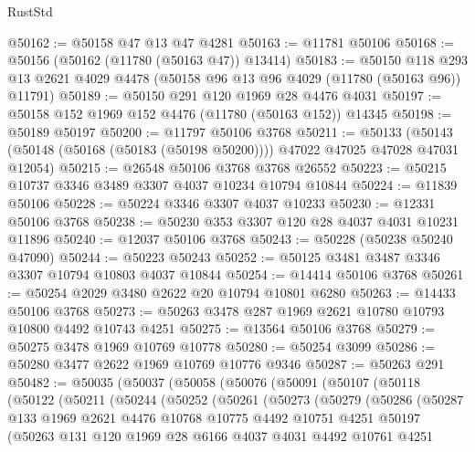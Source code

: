 \begin{lexlean}{RustStd}
\begin{coremodule}
@50162 := @50158 @47 @13 @47 @4281
@50163 := @11781 @50106
@50168 := @50156 (@50162 (@11780 (@50163 @47)) @13414)
@50183 := @50150
    @118
    @293
    @13
    @2621
    @4029
    @4478
    (@50158 @96 @13 @96 @4029 (@11780 (@50163 @96)) @11791)
@50189 := @50150 @291 @120 @1969 @28 @4476 @4031
@50197 := @50158 @152 @1969 @152 @4476 (@11780 (@50163 @152)) @14345
@50198 := @50189 @50197
@50200 := @11797 @50106 @3768
@50211 := @50133
    (@50143 (@50148 (@50168 (@50183 (@50198 @50200)))) @47022 @47025 @47028 @47031 @12054)
@50215 := @26548 @50106 @3768 @3768 @26552
@50223 := @50215 @10737 @3346 @3489 @3307 @4037 @10234 @10794 @10844
@50224 := @11839 @50106
@50228 := @50224 @3346 @3307 @4037 @10233
@50230 := @12331 @50106 @3768
@50238 := @50230 @353 @3307 @120 @28 @4037 @4031 @10231 @11896
@50240 := @12037 @50106 @3768
@50243 := @50228 (@50238 @50240 @47090)
@50244 := @50223 @50243
@50252 := @50125 @3481 @3487 @3346 @3307 @10794 @10803 @4037 @10844
@50254 := @14414 @50106 @3768
@50261 := @50254 @2029 @3480 @2622 @20 @10794 @10801 @6280
@50263 := @14433 @50106 @3768
@50273 := @50263 @3478 @287 @1969 @2621 @10780 @10793 @10800 @4492 @10743 @4251
@50275 := @13564 @50106 @3768
@50279 := @50275 @3478 @1969 @10769 @10778
@50280 := @50254 @3099
@50286 := @50280 @3477 @2622 @1969 @10769 @10776 @9346
@50287 := @50263 @291
@50482 := @50035
    (@50037
      (@50058
        (@50076
          (@50091
            (@50107
              (@50118
                (@50122
                  (@50211
                    (@50244
                      (@50252
                        (@50261
                          (@50273
                            (@50279
                              (@50286
                                (@50287
                                  @133
                                  @1969
                                  @2621
                                  @4476
                                  @10768
                                  @10775
                                  @4492
                                  @10751
                                  @4251
                                  @50197
                                  (@50263
                                    @131
                                    @120
                                    @1969
                                    @28
                                    @6166
                                    @4037
                                    @4031
                                    @4492
                                    @10761
                                    @4251

\end{coremodule}
\end{lexlean}
